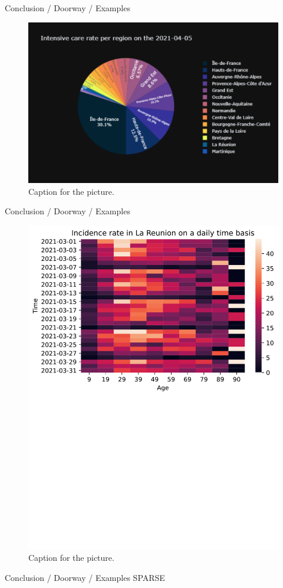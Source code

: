\documentclass[
  ignorenonframetext,
]{beamer}
\begin{document}
\begin{frame}{Conclusion / Doorway / Examples}
\protect\hypertarget{conclusion-doorway-examples-1}{}
\begin{figure}
\centering
\includegraphics{piechart.pdf}
\caption{Caption for the picture.}
\end{figure}
\end{frame}

\begin{frame}{Conclusion / Doorway / Examples}
\protect\hypertarget{conclusion-doorway-examples-2}{}
\begin{figure}
\centering
\includegraphics{heatmap_la_reunion_day.pdf}
\caption{Caption for the picture.}
\end{figure}
\end{frame}

\begin{frame}{Conclusion / Doorway / Examples}
\protect\hypertarget{conclusion-doorway-examples-3}{}
SPARSE
\end{frame}
\end{document}

